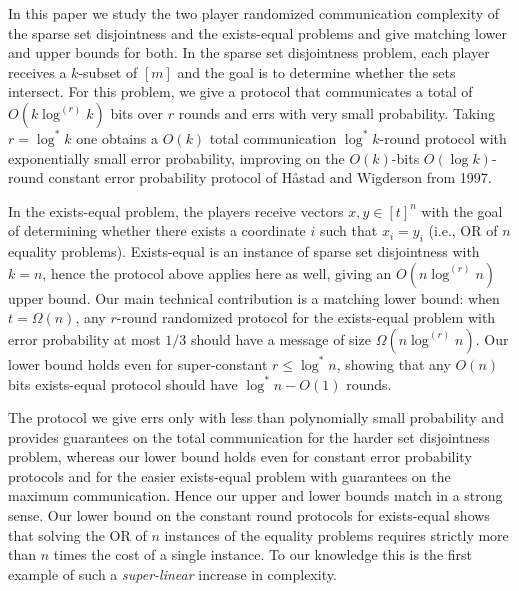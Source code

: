 
\renewenvironment{abstract}{\small \list{}{%
    \setlength{\leftmargin}{2em}%
    \setlength{\rightmargin}{\leftmargin}%
    \listparindent 1.4em%
  }\item{}}{\endlist}
  
\begin{abstract}
In this paper we study the two player randomized communication
complexity of the sparse set disjointness and the exists-equal 
problems and give matching lower and upper bounds for both. 
In the sparse set disjointness problem, each player
receives a $k$-subset of $[m]$ and the goal is to determine
whether the sets intersect. For this problem, we give a 
protocol that communicates a total of $O(k\log^{(r)}k)$ bits 
over $r$ rounds and errs with very small probability.
Taking $r=\log^{*}k$ one obtains a $O(k)$ total
communication $\log^{*}k$-round protocol with exponentially
small error probability, improving on the 
$O(k)$-bits $O(\log k)$-round constant error probability 
protocol of Håstad and Wigderson from 1997.

In the exists-equal problem, the players receive vectors 
$x,y\in[t]^n$ with the goal of determining whether there exists
a coordinate $i$ such that $x_i=y_i$ (i.e., OR of $n$ 
equality problems).
Exists-equal is an instance of sparse set disjointness with
$k=n$, hence the protocol above applies here as well, giving 
an $O(n\log^{(r)}n)$ upper bound.
Our main technical contribution is a matching 
lower bound: when $t=\Omega(n)$, any $r$-round
randomized protocol for the exists-equal problem with error 
probability at most $1/3$ should have a message of size 
$\Omega(n\log^{(r)}n)$. Our lower bound holds even for 
super-constant $r\le \log^*n$, showing that any $O(n)$ bits 
exists-equal protocol should have $\log^*n - O(1)$ rounds. 

The protocol we give errs only with less than 
polynomially small probability and provides guarantees on the 
total communication for the harder set disjointness problem, 
whereas our lower bound holds even for constant error 
probability protocols and for the easier exists-equal problem 
with guarantees on the maximum communication. Hence our upper and 
lower bounds match in a strong sense.
Our lower bound on the constant round protocols for
exists-equal shows that solving the OR of $n$ instances of the 
equality problems requires strictly more than $n$ times the cost 
of a single instance. To our knowledge this is the first example 
of such a {\em super-linear} increase in complexity.
\end{abstract}
